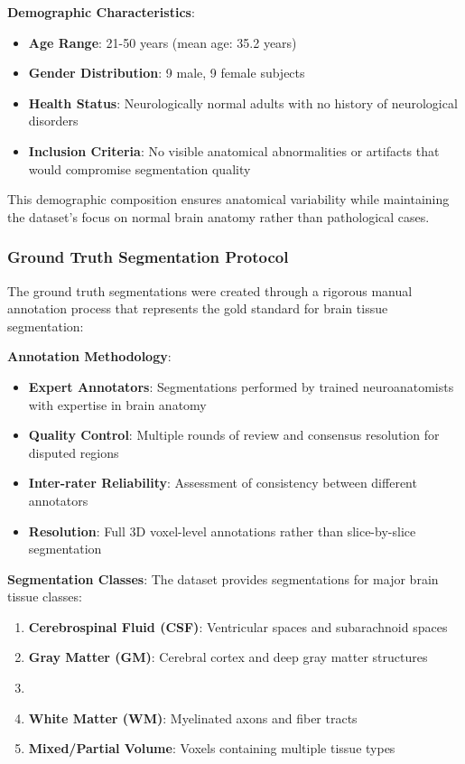 \documentclass[12pt,a4paper]{article}
\begin{document}
\textbf{Demographic Characteristics}:
\begin{itemize}
    \item \textbf{Age Range}: 21-50 years (mean age: 35.2 years)
    \item \textbf{Gender Distribution}: 9 male, 9 female subjects
    \item \textbf{Health Status}: Neurologically normal adults with no history of neurological disorders
    \item \textbf{Inclusion Criteria}: No visible anatomical abnormalities or artifacts that would compromise segmentation quality
\end{itemize}

This demographic composition ensures anatomical variability while maintaining the dataset's focus on normal brain anatomy rather than pathological cases.

\subsubsection{Ground Truth Segmentation Protocol}

The ground truth segmentations were created through a rigorous manual annotation process that represents the gold standard for brain tissue segmentation:

\textbf{Annotation Methodology}:
\begin{itemize}
    \item \textbf{Expert Annotators}: Segmentations performed by trained neuroanatomists with expertise in brain anatomy
    \item \textbf{Quality Control}: Multiple rounds of review and consensus resolution for disputed regions
    \item \textbf{Inter-rater Reliability}: Assessment of consistency between different annotators
    \item \textbf{Resolution}: Full 3D voxel-level annotations rather than slice-by-slice segmentation
\end{itemize}

\textbf{Segmentation Classes}:
The dataset provides segmentations for major brain tissue classes:
\begin{enumerate}
    \item \textbf{Cerebrospinal Fluid (CSF)}: Ventricular spaces and subarachnoid spaces
    \item \textbf{Gray Matter (GM)}: Cerebral cortex and deep gray matter structures
    \item \item \textbf{White Matter (WM)}: Myelinated axons and fiber tracts
    \item \textbf{Mixed/Partial Volume}: Voxels containing multiple tissue types
\end{enumerate}
\end{document}
